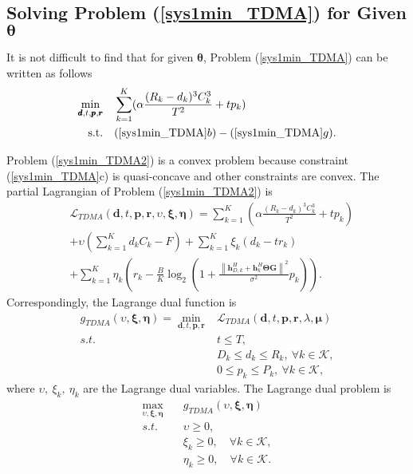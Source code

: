 \documentclass[journal]{IEEEtran}
\begin{document}
\subsection{Solving Problem (\ref{sys1min_TDMA}) for Given $\pmb \theta$}
It is not difficult to find that for given $\pmb \theta$, Problem (\ref{sys1min_TDMA}) can be written as follows
\begin{subequations}\label{sys1min_TDMA2}
	\begin{align}
	\mathop{\min}_{\pmb d,  t, \pmb p, \pmb r}\quad
	&\sum_{k=1}^K (\alpha\frac{(R_{k}-d_{k})^3 C^3_{k}}{T^2}+tp_k)
	\\
	\textrm{s.t.}\quad
	&(\ref{sys1min_TDMA}b)-(\ref{sys1min_TDMA}g).
	\end{align}
\end{subequations}

Problem (\ref{sys1min_TDMA2}) is a convex problem because constraint (\ref{sys1min_TDMA}c) is quasi-concave and other constraints are convex. The partial Lagrangian of Problem (\ref{sys1min_TDMA2}) is
{\begin{align}\label{lagarangian22}
&\mathcal L_{TDMA}(\pmb d,t,\pmb p,\pmb r,\upsilon,\pmb \xi,\pmb \eta)= \sum_{k=1}^K (\alpha\frac{(R_{k}-d_{k})^3 C^3_{k}}{T^2}+tp_k)\\ \nonumber
&+\upsilon( \sum_{k=1}^K d_kC_k-F)+\sum_{k=1}^K\xi_k(d_k-tr_k)\\\nonumber
&+\sum_{k=1}^K\eta_k\left(r_k-\frac{B}{K}\log_2\left( 1+ \frac{ \left\|\pmb h_{D,k}^H +\pmb h_{k}^H \pmb \Theta \pmb G\right\|^2}{\sigma^2}  {p_k} \right)\right).
\end{align}}
Correspondingly, the Lagrange dual function is
\begin{subequations}\label{sys1min3TDMA}
	\begin{align}
	g_{TDMA}(\upsilon,\pmb \xi,\pmb \eta)=\mathop{\min}_{\pmb d, t, \pmb p, \pmb r}& \mathcal L_{TDMA}(\pmb d,  t, \pmb p, \pmb r, \lambda,\pmb \mu)\\
	s.t. \quad & t \leq T,\\
	&  D_{k} \leq d_{k} \leq R_{k},~ \forall k\in\mathcal K,\\
	& 0 \leq p_k \leq P_k, ~ \forall k\in\mathcal K,
	\end{align}
\end{subequations}
where $\upsilon,~\xi_k,~ \eta_k$ are the Lagrange dual variables. The Lagrange dual problem is
\begin{subequations}\label{sys1min4TDMA}
	\begin{align}
	\mathop{\max}_{\upsilon,\pmb \xi,\pmb \eta}& \quad g_{TDMA}(\upsilon,\pmb \xi,\pmb \eta)\\
	s.t.
	&\quad  \upsilon \geq 0,\\
	&\quad  \xi_k \geq 0, \quad \forall k\in\mathcal K,\\
	&\quad  \eta_k \geq 0, \quad \forall k\in\mathcal K.
	\end{align}
\end{subequations}
\end{document}
